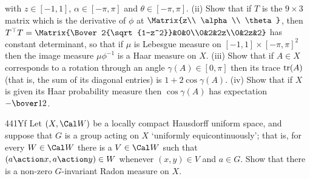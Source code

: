 {\noindent with $z\in[-1,1]$, $\alpha\in[-\pi,\pi]$ and
$\theta\in[-\pi,\pi]$.   (ii) Show that if $T$ is the $9\times 3$ matrix
which is the derivative of $\phi$ at $\Matrix{z\\ \alpha\\ \theta}$,
then $T\trs T=\Matrix{\Bover2{\sqrt{1-z^2}}&0&0\\0&2&2z\\0&2z&2}$ has
constant determinant,
so that if $\mu$ is Lebesgue measure on $[-1,1]\times[-\pi,\pi]^2$
then the image measure $\mu\phi^{-1}$ is a Haar measure on $X$.
   (iii)
Show that if $A\in X$ corresponds to a rotation through an angle
$\gamma(A)\in[0,\pi]$
then its trace $\mathop{\text{tr}}\nolimits(A)$ (that is, the sum of its diagonal entries) is
$1+2\cos\gamma(A)$.      (iv) Show that if $X$ is given its Haar
probability measure then $\cos\gamma(A)$ has expectation $-\bover12$.

\spheader 441Yf Let $(X,\Cal W)$ be a locally compact Hausdorff uniform
space, and suppose that $G$ is a group acting on $X$ `uniformly
equicontinuously';  that is, for every $W\in\Cal W$ there is a
$V\in\Cal W$ such that $(a\action x,a\action y)\in W$ whenever
$(x,y)\in V$ and
$a\in G$.   Show that there is a non-zero $G$-invariant Radon measure on
$X$.

}
